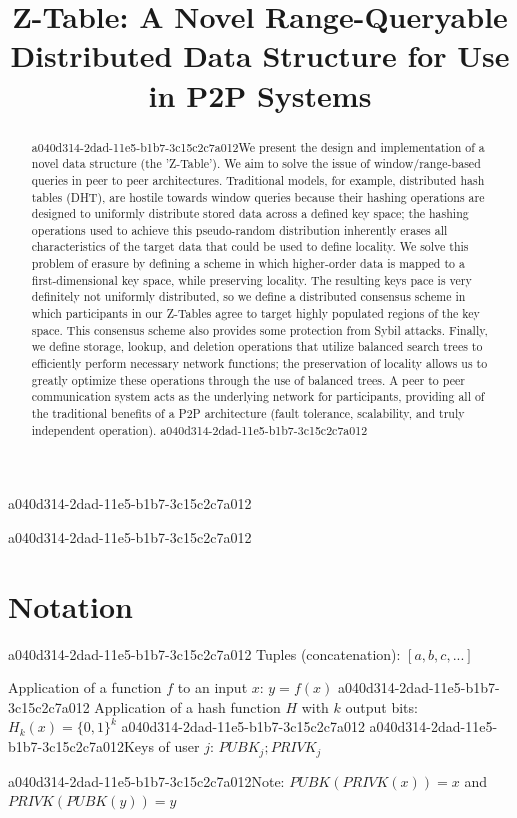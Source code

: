\documentclass[12pt]{article}
\title{Z-Table: A Novel Range-Queryable Distributed Data Structure for Use in P2P Systems}
\begin{document}
\maketitle
a040d314-2dad-11e5-b1b7-3c15c2c7a012
\begin{abstract}
a040d314-2dad-11e5-b1b7-3c15c2c7a012We present the design and implementation of a novel data structure (the 'Z-Table'). We aim to solve the issue of window/range-based queries in peer to peer architectures. Traditional models, for example,  distributed hash tables (DHT), are hostile towards window queries because their hashing operations are designed to uniformly distribute stored data across a defined key space; the hashing operations used to achieve this pseudo-random distribution inherently erases all characteristics of the target data that could be used to define locality. We solve this problem of erasure by defining a scheme in which higher-order data is mapped to a first-dimensional key space, while preserving locality. The resulting keys pace is very definitely not uniformly distributed, so we define a distributed consensus scheme in which participants in our Z-Tables agree to target highly populated regions of the key space. This consensus scheme also provides some protection from Sybil attacks. Finally, we define storage, lookup, and deletion operations that utilize balanced search trees to efficiently perform necessary network functions; the preservation of locality allows us to greatly optimize these operations through the use of balanced trees. A peer to peer communication system acts as the underlying network for participants, providing all of the traditional benefits of a P2P architecture (fault tolerance, scalability, and truly independent operation).
a040d314-2dad-11e5-b1b7-3c15c2c7a012\end{abstract}
a040d314-2dad-11e5-b1b7-3c15c2c7a012
\section{Notation}
a040d314-2dad-11e5-b1b7-3c15c2c7a012
Tuples (concatenation): $[a,b,c,...]$

Application of a function $f$ to an input $x$: $y=f(x)$
a040d314-2dad-11e5-b1b7-3c15c2c7a012
Application of a hash function $H$ with $k$ output bits: $H_{k}(x) = \{0,1\}^k$
a040d314-2dad-11e5-b1b7-3c15c2c7a012
a040d314-2dad-11e5-b1b7-3c15c2c7a012Keys of user $j$: $ PUBK_j; PRIVK_j $

a040d314-2dad-11e5-b1b7-3c15c2c7a012Note: $PUBK(PRIVK(x)) = x$ and $PRIVK(PUBK(y)) = y$~
\end{document}
